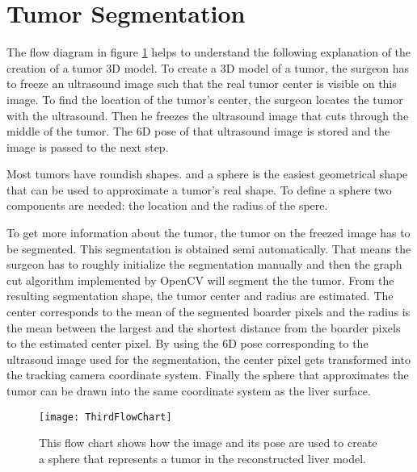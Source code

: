 \section{Tumor Segmentation}
\label{sec:tumorSegmentation}
The flow diagram in figure \ref{fig:ThirdFlowChart} helps to understand the
following explanation of the creation of a tumor 3D model.
To create a 3D model of a tumor, the surgeon has to freeze an ultrasound image
such that the real tumor center is visible on this image. To find the location
of the tumor's center, the surgeon locates the tumor with the
ultrasound. Then he freezes the ultrasound image that cuts through the middle of
the tumor. The 6D pose of that ultrasound image is stored and the image is
passed to the next step.

Most tumors have roundish shapes. and a sphere is the easiest
geometrical shape that can be used to approximate a tumor's real shape. To
define a sphere two components are needed: the location and the radius of the
spere.

To get more information about the tumor, the tumor on the freezed image has to be segmented. This
segmentation is obtained semi automatically. That means the surgeon has to
roughly initialize the segmentation manually and then the graph cut algorithm
implemented by OpenCV will segment the the tumor. From the resulting
segmentation shape, the tumor center and radius are estimated. The center
corresponds to the mean of the segmented boarder pixels and the radius is the
mean between the largest and the shortest distance from the boarder pixels to
the estimated center pixel. By using the 6D pose corresponding to the ultrasoud
image used for the segmentation, the center pixel gets transformed into the
tracking camera coordinate system. Finally the sphere that approximates the
tumor can be drawn into the same coordinate system as the liver surface.
\begin{figure}[H]
  \centering
 \texttt{[image: ThirdFlowChart]}
  \caption{This flow chart shows how the image and its pose are used to create a
    sphere that represents a tumor in the reconstructed liver model.}
  \label{fig:ThirdFlowChart}
\end{figure}

